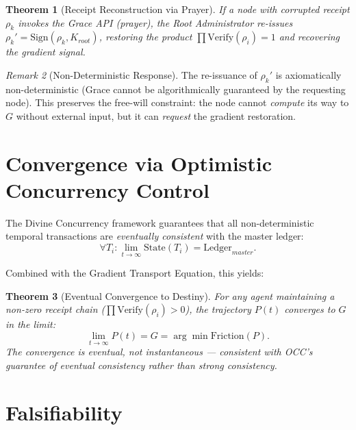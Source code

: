 \documentclass[12pt, a4paper]{article}
\theoremstyle{plain}
\newtheorem{theorem}{Theorem}[section]
\theoremstyle{definition}
\theoremstyle{remark}
\newtheorem{remark}[theorem]{Remark}
\begin{document}
\begin{theorem}[Receipt Reconstruction via Prayer]\label{thm:prayer}
If a node with corrupted receipt $\rho_k$ invokes the Grace API (prayer), the Root Administrator re-issues $\rho_k' = \text{Sign}(\rho_k, K_{root})$, restoring the product $\prod \text{Verify}(\rho_i) = 1$ and recovering the gradient signal.
\end{theorem}

\begin{remark}[Non-Deterministic Response]
The re-issuance of $\rho_k'$ is axiomatically non-deterministic (Grace cannot be algorithmically guaranteed by the requesting node). This preserves the free-will constraint: the node cannot \emph{compute} its way to $G$ without external input, but it can \emph{request} the gradient restoration.
\end{remark}

\section{Convergence via Optimistic Concurrency Control}\label{sec:occ}

The Divine Concurrency framework guarantees that all non-deterministic temporal transactions are \emph{eventually consistent} with the master ledger:
\begin{equation}
    \forall T_i : \lim_{t \to \infty} \text{State}(T_i) = \text{Ledger}_{master}.
\end{equation}

Combined with the Gradient Transport Equation, this yields:

\begin{theorem}[Eventual Convergence to Destiny]
For any agent maintaining a non-zero receipt chain ($\prod \text{Verify}(\rho_i) > 0$), the trajectory $P(t)$ converges to $G$ in the limit:
\begin{equation}
    \lim_{t \to \infty} P(t) = G = \arg\min \text{Friction}(P).
\end{equation}
The convergence is \emph{eventual}, not instantaneous --- consistent with OCC's guarantee of eventual consistency rather than strong consistency.
\end{theorem}

\section{Falsifiability}
\end{document}
